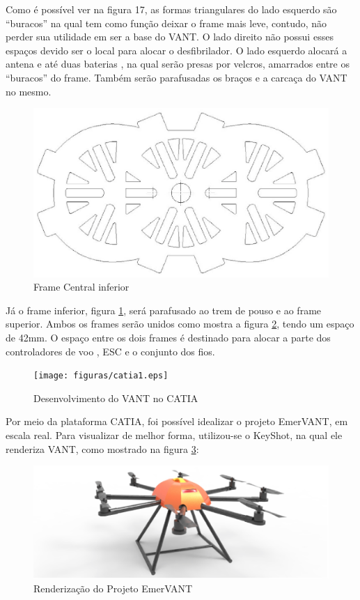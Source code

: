 Como é possível ver na figura 17, as formas triangulares do lado esquerdo são “buracos” na qual tem como função deixar o frame mais leve, contudo, não perder sua utilidade em ser a base do VANT. O lado direito não possui esses espaços devido ser o local para alocar o desfibrilador. O lado esquerdo alocará a antena e até duas baterias , na qual serão presas por velcros, amarrados entre os “buracos” do frame. Também serão parafusadas os braços e a carcaça do VANT no mesmo.

\begin{figure}[H]
    \centering
      \includegraphics[keepaspectratio=true,scale=0.5]{figuras/drawinfinfo.eps}
    \caption{ Frame Central inferior}
    \label{fig:drawinfinfo}
\end{figure}

Já o frame inferior, figura \ref{fig:drawinfinfo}, será parafusado ao trem de pouso e ao frame superior.  Ambos os frames serão unidos como mostra a figura \ref{fig:catia1}, tendo um espaço de 42mm. O espaço entre os dois frames é destinado para alocar a parte dos controladores de voo , ESC e o conjunto dos fios.

\begin{figure}[H]
    \centering
      \texttt{[image: figuras/catia1.eps]}
    \caption{Desenvolvimento do VANT no CATIA}
    \label{fig:catia1}
\end{figure}

Por meio da plataforma CATIA, foi possível idealizar o projeto EmerVANT, em escala real. Para visualizar de melhor forma, utilizou-se o KeyShot, na qual ele renderiza VANT, como mostrado na figura \ref{fig:keyshot1}:

\begin{figure}[H]
    \centering
      \includegraphics[keepaspectratio=true,scale=0.5]{figuras/keyshot1.eps}
    \caption{ Renderização do Projeto EmerVANT}
    \label{fig:keyshot1}
\end{figure}


